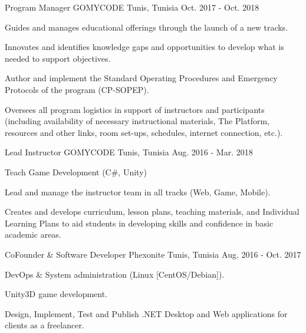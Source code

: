 \begin{cventries}
  \cventry
    {Program Manager} %
    {GOMYCODE} %
    {Tunis, Tunisia} %
    {Oct. 2017 - Oct. 2018} %
    {
      \begin{cvitems} %
        \item {Guides and manages educational offerings through the launch of a new tracks.}
        \item {Innovates and identifies knowledge gaps and opportunities to develop what is needed to support objectives.}
        \item {Author and implement the Standard Operating Procedures and Emergency Protocols of the program (CP-SOPEP).}
        \item {Oversees all program logistics in support of instructors and participants (including availability
of necessary instructional materials, The Platform, resources and other links, room set-ups, schedules, internet connection, etc.).}
      \end{cvitems}
    }

  \cventry
    {Lead Instructor} %
    {GOMYCODE} %
    {Tunis, Tunisia} %
    {Aug. 2016 - Mar. 2018} %
    {
      \begin{cvitems} %
        \item {Teach Game Development (C\#, Unity)}
        \item {Lead and manage the instructor team in all tracks (Web, Game, Mobile).}
        \item{Creates and develops curriculum, lesson plans, teaching materials, and Individual Learning Plans to aid students in developing skills and confidence in basic academic areas.}
      \end{cvitems}
    }

  \cventry
    {CoFounder \& Software Developer} %
    {Phexonite} %
    {Tunis, Tunisia} %
    {Aug. 2016 - Oct. 2017} %
    {
      \begin{cvitems} %
        \item {DevOps \& System administration (Linux [CentOS/Debian]).}
        \item {Unity3D game development.}
        \item {Design, Implement, Test and Publish .NET Desktop and Web applications for clients as a freelancer.}
      \end{cvitems}
    }


\end{cventries}
